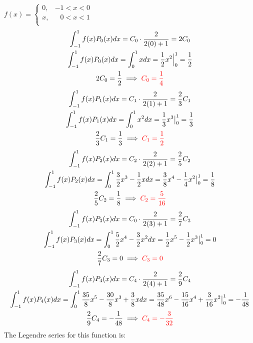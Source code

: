 \item [2.] $\displaystyle f(x) = 
\begin{cases}
    0, & -1 < x < 0\\
    x, & \:\:\,\,0 < x < 1\\
\end{cases}$
\begin{gather*}
    \int_{-1}^{1}f(x)P_0(x)dx =C_0\cdot \frac{2}{2(0)+1} = 2C_0\\
    \int_{-1}^{1}f(x)P_0(x)dx = \int_0^1 x dx = \frac{1}{2}x^2\Big|_0^1 = \frac{1}{2}\\
    2C_0 = \frac{1}{2} \implies \textcolor{red}{C_0 = \frac{1}{4}}
\end{gather*}
\begin{gather*}
    \int_{-1}^{1}f(x)P_1(x)dx =C_1\cdot \frac{2}{2(1)+1} = \frac{2}{3}C_1\\
    \int_{-1}^{1}f(x)P_1(x)dx 
    = \int_0^1 x^2 dx = \frac{1}{3}x^3\big|_0^1 = \frac{1}{3}\\
    \frac{2}{3}C_1 = \frac{1}{3} \implies \textcolor{red}{C_1 = \frac{1}{2}}
\end{gather*}
\begin{gather*}
    \int_{-1}^{1}f(x)P_2(x)dx =C_2\cdot \frac{2}{2(2)+1} = \frac{2}{5}C_2\\
    \int_{-1}^{1}f(x)P_2(x)dx
    = \int_0^1 \frac{3}{2}x^3-\frac{1}{2}x dx 
    = \frac{3}{8}x^4-\frac{1}{4}x^2\big|_0^1 
    = \frac{1}{8}\\
    \frac{2}{5}C_2 = \frac{1}{8} \implies \textcolor{red}{C_2 = \frac{5}{16}}
\end{gather*}
\begin{gather*}
    \int_{-1}^{1}f(x)P_3(x)dx =C_0\cdot \frac{2}{2(3)+1} = \frac{2}{7}C_3\\
    \int_{-1}^{1}f(x)P_3(x)dx 
    = \int_0^1 \frac{5}{2}x^4 - \frac{3}{2}x^2 dx 
    = \frac{1}{2}x^5-\frac{1}{2}x^3\big|_0^1 
    = 0\\
    \frac{2}{7}C_3 = 0 \implies \textcolor{red}{C_3 = 0}
\end{gather*}
\begin{gather*}
    \int_{-1}^{1}f(x)P_4(x)dx =C_4\cdot \frac{2}{2(4)+1} = \frac{2}{9}C_4\\
    \int_{-1}^{1}f(x)P_4(x)dx
    = \int_0^1 \frac{35}{8}x^5 - \frac{30}{8}x^3 + \frac{3}{8}x dx 
    = \frac{35}{48}x^6 - \frac{15}{16}x^4 + \frac{3}{16}x^2\big|_0^1 
    = -\frac{1}{48}\\
    \frac{2}{9}C_4 = -\frac{1}{48} \implies \textcolor{red}{C_4 = -\frac{3}{32}}
\end{gather*}
The Legendre series for this function is:
